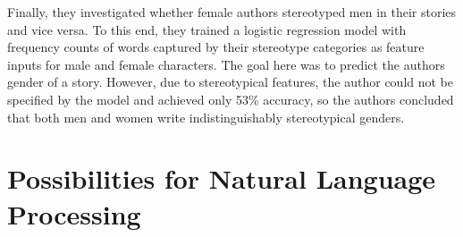Finally, they investigated whether female authors stereotyped men in their stories and vice versa.
To this end, they trained a logistic regression model with frequency counts of words captured by their stereotype categories as feature inputs for male and female characters.
The goal here was to predict the authors gender of a story.
However, due to stereotypical features, the author could not be specified by the model and achieved only 53\% accuracy, so the authors concluded that both men and women write indistinguishably stereotypical genders.



\section{Possibilities for Natural Language Processing}\label{sec:possibilities-for-nlp}

